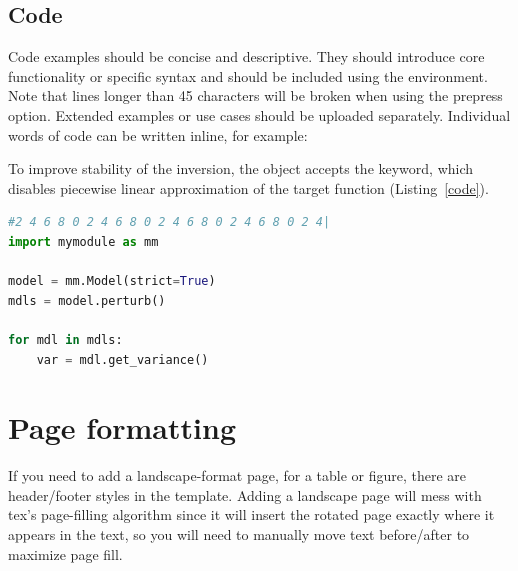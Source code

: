 \documentclass[breakmath,report,languages={french,japanese,arabic}]{seismica}
\begin{document}
	\subsection{Code}

Code examples should be concise and descriptive. They should introduce core functionality or specific syntax and should be included using the  environment. Note that lines longer than 45 characters will be broken when using the prepress option. Extended examples or use cases should be uploaded separately. Individual words of code can be written inline, for example:

To improve stability of the inversion, the  object accepts the  keyword, which disables piecewise linear approximation of the target function (Listing~\ref{code}).

\begin{lstlisting}[caption=Example use of \code{Model}, label=code, language=Python]
#2 4 6 8 0 2 4 6 8 0 2 4 6 8 0 2 4 6 8 0 2 4|
import mymodule as mm

model = mm.Model(strict=True)
mdls = model.perturb()

for mdl in mdls:
	var = mdl.get_variance()
\end{lstlisting}

\section{Page formatting}
If you need to add a landscape-format page, for a table or figure, there are header/footer styles in the template. Adding a landscape page will mess with tex's page-filling algorithm since it will insert the rotated page exactly where it appears in the text, so you will need to manually move text before/after to maximize page fill.




\end{document}
